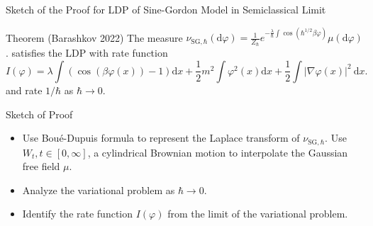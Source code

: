 \documentclass{if-beamer}
\begin{document}
\begin{frame}{Sketch of the Proof for LDP of Sine-Gordon Model in Semiclassical Limit}
\begin{block}{Theorem (Barashkov 2022)}
    The measure $\nu_{\mathrm{SG}, \hbar}(\mathrm{d} \varphi)=\frac{1}{Z_{\hbar}} e^{-\frac{\lambda}{\hbar} \int \cos \left(\hbar^{1 / 2} \beta \varphi\right)} \mu(\mathrm{d} \varphi)$.
    satisfies the LDP with rate function 
    \[
I(\varphi)=\lambda \int(\cos (\beta \varphi(x))-1) \mathrm{d} x+\frac{1}{2} m^2 \int \varphi^2(x) \mathrm{d} x+\frac{1}{2} \int|\nabla \varphi(x)|^2 \mathrm{~d} x .
\]
    and rate $1 / \hbar$ as $\hbar \to 0$.
\end{block}
\begin{block}{Sketch of Proof}
    \begin{itemize}[<+->]
        \item Use Boué-Dupuis formula to represent the Laplace transform of $\nu_{\mathrm{SG}, \hbar}$.
Use $W_t, t \in [0, \infty]$, a cylindrical Brownian motion to interpolate the Gaussian free field $\mu$.
        \item Analyze the variational problem as $\hbar \to 0$.
        \item Identify the rate function $I(\varphi)$ from the limit of the variational problem.
    \end{itemize}

\end{block}
\end{frame}
\end{document}
